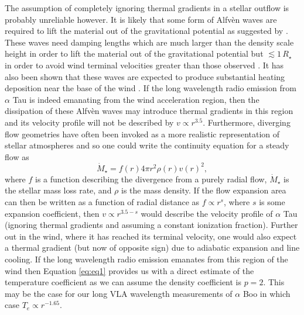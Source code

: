 \documentclass[iop]{emulateapj}
\begin{document}
The assumption of completely ignoring thermal gradients in a stellar outflow is probably unreliable however. It is likely that some form of Alfv\`{e}n waves are required to lift the material out of the gravitational potential as suggested by \cite{1980ApJ...242..260H}. These waves need damping lengths which are much larger than the density scale height in order to lift the material out of the gravitational potential but $\lesssim 1 \, R_{\star}$ in order to avoid wind terminal velocities greater than those observed \citep[e.g.][]{1989A&A...209..327J}. It has also been shown that these waves are expected to produce substantial heating deposition near the base of the wind \citep{1982ApJ...261..279H,2006MNRAS.368.1145F}. If the long wavelength radio emission from $\alpha$ Tau is indeed emanating from the wind acceleration region, then the dissipation of these Alfv\`{e}n waves may introduce thermal gradients in this region and its velocity profile will not be described by $v \propto r^{3.5}$. Furthermore, diverging flow geometries have often been invoked as a more realistic representation of stellar atmospheres \citep{1982ApJ...257..264H} and so one could write the continuity equation for a steady flow as 
\begin{equation}
\dot{M} _{\star} = f(r)4\pi r^2 \rho (r) v(r)^2,
\end{equation}
where $f$ is a function describing the divergence from a purely radial flow, $\dot{M} _{\star}$ is the stellar mass loss rate, and $\rho$ is the mass density. If the flow expansion area can then be written as  a function of radial distance as $f \propto r^s$, where $s$ is some expansion coefficient, then $v \propto r^{3.5-s}$ would describe the velocity profile of $\alpha$ Tau (ignoring thermal gradients and assuming a constant ionization fraction). Further out in the wind, where it has reached its terminal velocity, one would also expect a thermal gradient (but now of opposite sign) due to adiabatic expansion and line cooling. If the long wavelength radio emission emanates from this region of the wind then Equation \ref{eq:eq1} provides us with a direct estimate of the temperature coefficient as we can assume the density coefficient is $p=2$. This may be the case for our long VLA wavelength measurements of $\alpha$ Boo in which case $T_{e} \propto r^{-1.65}$.
\end{document}
